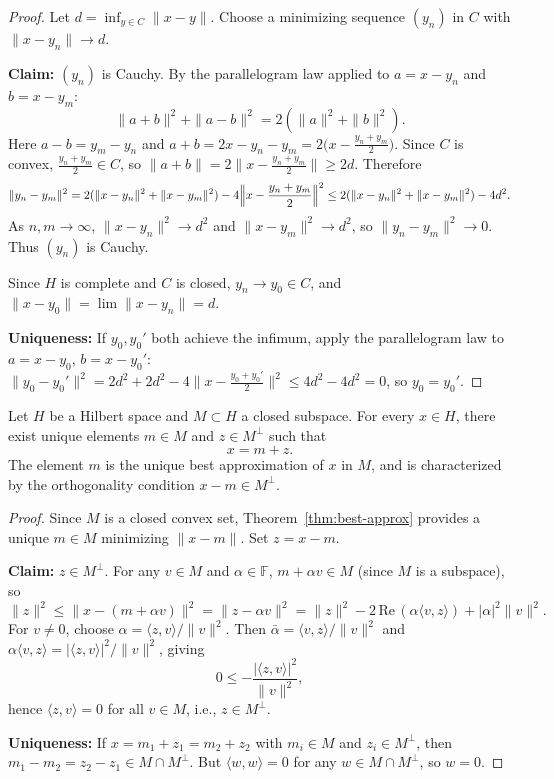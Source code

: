 \documentclass[11pt,a4paper]{article}
\begin{document}
\begin{proof}
Let $d = \inf_{y \in C} \|x - y\|$. Choose a minimizing sequence
$(y_n)$ in $C$ with $\|x - y_n\| \to d$.

\textbf{Claim:} $(y_n)$ is Cauchy. By the parallelogram law applied to
$a = x - y_n$ and $b = x - y_m$:
\[
    \|a + b\|^2 + \|a - b\|^2 = 2(\|a\|^2 + \|b\|^2).
\]
Here $a - b = y_m - y_n$ and
$a + b = 2x - y_n - y_m = 2\bigl(x - \tfrac{y_n + y_m}{2}\bigr)$.
Since $C$ is convex, $\tfrac{y_n + y_m}{2} \in C$, so
$\|a + b\| = 2\bigl\|x - \tfrac{y_n + y_m}{2}\bigr\| \geq 2d$.
Therefore
\[
    \|y_n - y_m\|^2
    = 2(\|x - y_n\|^2 + \|x - y_m\|^2)
      - 4\Bigl\|x - \frac{y_n + y_m}{2}\Bigr\|^2
    \leq 2(\|x - y_n\|^2 + \|x - y_m\|^2) - 4d^2.
\]
As $n, m \to \infty$, $\|x - y_n\|^2 \to d^2$ and
$\|x - y_m\|^2 \to d^2$, so $\|y_n - y_m\|^2 \to 0$. Thus $(y_n)$ is
Cauchy.

Since $H$ is complete and $C$ is closed, $y_n \to y_0 \in C$, and
$\|x - y_0\| = \lim \|x - y_n\| = d$.

\textbf{Uniqueness:} If $y_0, y_0'$ both achieve the infimum, apply the
parallelogram law to $a = x - y_0$, $b = x - y_0'$:
$\|y_0 - y_0'\|^2 = 2d^2 + 2d^2
- 4\|x - \tfrac{y_0 + y_0'}{2}\|^2
\leq 4d^2 - 4d^2 = 0$, so $y_0 = y_0'$.
\end{proof}

\begin{theorem}
\label{thm:projection}
Let $H$ be a Hilbert space and $M \subset H$ a closed subspace. For
every $x \in H$, there exist unique elements $m \in M$ and
$z \in M^\perp$ such that
\[
    x = m + z.
\]
The element $m$ is the unique best approximation of $x$ in $M$, and is
characterized by the orthogonality condition $x - m \in M^\perp$.
\end{theorem}

\begin{proof}
Since $M$ is a closed convex set, Theorem~\ref{thm:best-approx}
provides a unique $m \in M$ minimizing $\|x - m\|$. Set $z = x - m$.

\textbf{Claim:} $z \in M^\perp$. For any $v \in M$ and
$\alpha \in \mathbb{F}$, $m + \alpha v \in M$ (since $M$ is a
subspace), so
\[
    \|z\|^2 \leq \|x - (m + \alpha v)\|^2 = \|z - \alpha v\|^2
    = \|z\|^2 - 2\,\mathrm{Re}\,(\alpha \langle v, z \rangle)
      + |\alpha|^2 \|v\|^2.
\]
For $v \neq 0$, choose $\alpha = \langle z, v \rangle / \|v\|^2$.
Then $\bar{\alpha} = \langle v, z \rangle / \|v\|^2$ and
$\alpha \langle v, z \rangle = |\langle z, v \rangle|^2 / \|v\|^2$,
giving
\[
    0 \leq -\frac{|\langle z, v \rangle|^2}{\|v\|^2},
\]
hence $\langle z, v \rangle = 0$ for all $v \in M$, i.e.,
$z \in M^\perp$.

\textbf{Uniqueness:} If $x = m_1 + z_1 = m_2 + z_2$ with $m_i \in M$
and $z_i \in M^\perp$, then
$m_1 - m_2 = z_2 - z_1 \in M \cap M^\perp$. But
$\langle w, w \rangle = 0$ for any $w \in M \cap M^\perp$, so $w = 0$.
\end{proof}
\end{document}
